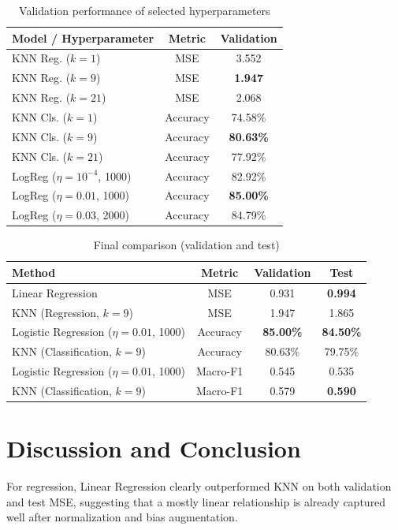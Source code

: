 \documentclass[10pt, twocolumn, letterpaper]{article}
\begin{document}
\begin{table}[h]
\centering
\caption{Validation performance of selected hyperparameters}
\label{tab:tuning}
\begin{tabular}{@{}lcc@{}}
\toprule
\textbf{Model / Hyperparameter} & \textbf{Metric} & \textbf{Validation} \\ \midrule
KNN Reg. ($k=1$)  & MSE      & 3.552 \\
KNN Reg. ($k=9$)  & MSE      & \textbf{1.947} \\
KNN Reg. ($k=21$) & MSE      & 2.068 \\ \addlinespace
KNN Cls. ($k=1$)  & Accuracy & 74.58\% \\
KNN Cls. ($k=9$)  & Accuracy & \textbf{80.63\%} \\
KNN Cls. ($k=21$) & Accuracy & 77.92\% \\ \addlinespace
LogReg ($\eta=10^{-4}$, 1000) & Accuracy & 82.92\% \\
LogReg ($\eta=0.01$, 1000)    & Accuracy & \textbf{85.00\%} \\
LogReg ($\eta=0.03$, 2000)    & Accuracy & 84.79\% \\
\bottomrule
\end{tabular}
\end{table}

\begin{table}[h]
\centering
\caption{Final comparison (validation and test)}
\label{tab:results}
\begin{tabular}{@{}lccc@{}}
\toprule
\textbf{Method} & \textbf{Metric} & \textbf{Validation} & \textbf{Test} \\ \midrule
Linear Regression & MSE & 0.931 & \textbf{0.994} \\
KNN (Regression, $k=9$) & MSE & 1.947 & 1.865 \\ \addlinespace
Logistic Regression ($\eta=0.01$, 1000) & Accuracy & \textbf{85.00\%} & \textbf{84.50\%} \\
KNN (Classification, $k=9$) & Accuracy & 80.63\% & 79.75\% \\
Logistic Regression ($\eta=0.01$, 1000) & Macro-F1 & 0.545 & 0.535 \\
KNN (Classification, $k=9$) & Macro-F1 & 0.579 & \textbf{0.590} \\
\bottomrule
\end{tabular}
\end{table}

\section{Discussion and Conclusion}
For regression, Linear Regression clearly outperformed KNN on both validation and test MSE, suggesting that a mostly linear relationship is already captured well after normalization and bias augmentation.
\end{document}
